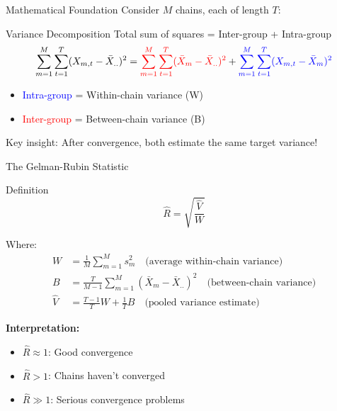 \begin{frame}{Mathematical Foundation}
	Consider $M$ chains, each of length $T$:

	\begin{block}{Variance Decomposition}
		Total sum of squares = Inter-group + Intra-group
		$$\sum_{m=1}^M \sum_{t=1}^T (X_{m,t} - \bar{X}_{..})^2 =
			\textcolor{red}{\sum_{m=1}^M \sum_{t=1}^T (\bar{X}_m - \bar{X}_{..})^2} +
			\textcolor{blue}{\sum_{m=1}^M \sum_{t=1}^T (X_{m,t} - \bar{X}_m)^2}$$
	\end{block}

	\vspace{0.3cm}
	\begin{itemize}
		\item \textcolor{blue}{Intra-group} = Within-chain variance (W)
		\item \textcolor{red}{Inter-group} = Between-chain variance (B)
	\end{itemize}

	\vspace{0.3cm}
	Key insight: After convergence, both estimate the same target variance!
\end{frame}

\begin{frame}{The Gelman-Rubin Statistic}
	\begin{block}{Definition}
		$$\hat{R} = \sqrt{\frac{\hat{V}}{W}}$$
	\end{block}

	Where:
	\begin{align*}
		W       & = \frac{1}{M} \sum_{m=1}^M s_m^2 \quad \text{(average within-chain variance)}                   \\
		B       & = \frac{T}{M-1} \sum_{m=1}^M (\bar{X}_m - \bar{X}_{..})^2 \quad \text{(between-chain variance)} \\
		\hat{V} & = \frac{T-1}{T}W + \frac{1}{T}B \quad \text{(pooled variance estimate)}
	\end{align*}

	\vspace{0.3cm}
	\textbf{Interpretation:}
	\begin{itemize}
		\item $\hat{R} \approx 1$: Good convergence
		\item $\hat{R} > 1$: Chains haven't converged
		\item $\hat{R} \gg 1$: Serious convergence problems
	\end{itemize}
\end{frame}

